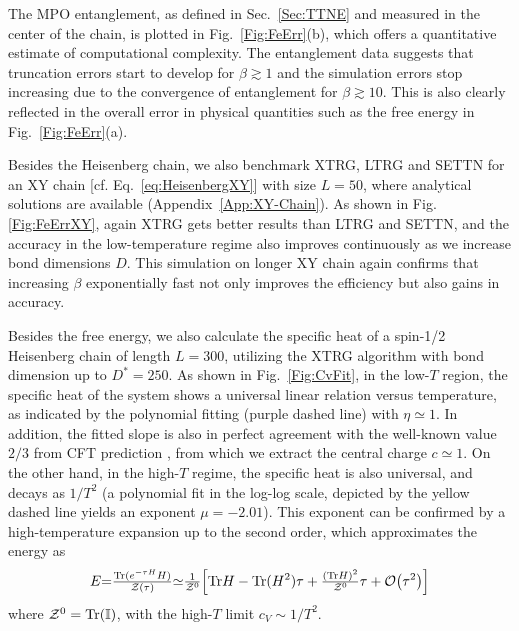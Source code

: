 \documentclass[aps,prx,twocolumn,showpacs,psfig,superscriptaddress,longbibliography]{revtex4-1}
\newcommand{\order}[1]{\mathcal{O}{\left(#1\right)}}
\newcommand{\Sec}[1]{Sec.~\ref{#1}}
\newcommand{\App}[1]{Appendix~\ref{#1}}
\newcommand{\Eq}[1]{Eq.~\eqref{#1}}
\newcommand{\Fig}[1]{Fig.~\ref{#1}}
\def\Dstar{D^\ast}
\begin{document}
The MPO entanglement, as defined in \Sec{Sec:TTNE} and measured in
the center of the chain, is plotted in \Fig{Fig:FeErr}(b), which
offers a quantitative estimate of computational complexity.  The
entanglement data  {suggests} that truncation errors start to develop
for $\beta\gtrsim 1$ and the simulation errors stop increasing due
to the convergence of entanglement for $\beta \gtrsim 10$. This is
also clearly reflected in the overall error in physical quantities
such as the free energy in \Fig{Fig:FeErr}(a).

Besides the Heisenberg chain, we also benchmark XTRG, LTRG and SETTN
for an XY chain [cf. \Eq{eq:HeisenbergXY}] with size $L=50$, where
analytical solutions are available (\App{App:XY-Chain}).  As shown
in Fig. \ref{Fig:FeErrXY}, again XTRG gets better results than LTRG
and SETTN, and the accuracy in the low-temperature regime also
improves continuously as we increase bond dimensions $D$.  This
simulation on longer XY chain again confirms that increasing
$\beta$ exponentially fast not only improves the efficiency but
also gains in accuracy.

Besides the free energy, we also calculate the specific heat of a
spin-1/2 Heisenberg chain of length $L=300$, utilizing the XTRG
algorithm with bond dimension up to $\Dstar=250$. As shown in
\Fig{Fig:CvFit}, in the low-$T$ region, the specific heat of the
system shows a universal linear relation versus temperature, as
indicated by the polynomial fitting (purple dashed line) with $\eta
\simeq 1$.  In addition, the fitted slope is also in perfect
agreement with the well-known value $2/3$ from CFT prediction
\cite{Affleck.I:1986:UniversalTerm}, from which we extract the
central charge $c\simeq1$.  On the other hand, in the high-$T$
regime, the specific heat is also universal, and decays as $1/T^2$
(a polynomial fit in the log-log scale, depicted by the yellow
dashed line yields an exponent $\mu = -2.01 $).  This exponent can
be confirmed by a high-temperature expansion up to the second order,
which approximates the energy as
%
\begin{eqnarray*} E{=}\tfrac{\mathrm{Tr} (e^{-\tau H}
H)}{\mathcal{Z}(\tau)} {\simeq} \tfrac{1}{\mathcal{Z}^0} \Bigl[
\mathrm{Tr} H - \mathrm{Tr} (H^2) \tau + \tfrac{(\mathrm{Tr}
H)^2}{\mathcal{Z}^0} \tau + \order{\tau^2} \Bigr] \end{eqnarray*}
where $\mathcal{Z}^0=\rm{Tr} (\mathbb{I})$, with the high-$T$ limit
$c_V \sim 1/T^2$.
\end{document}
